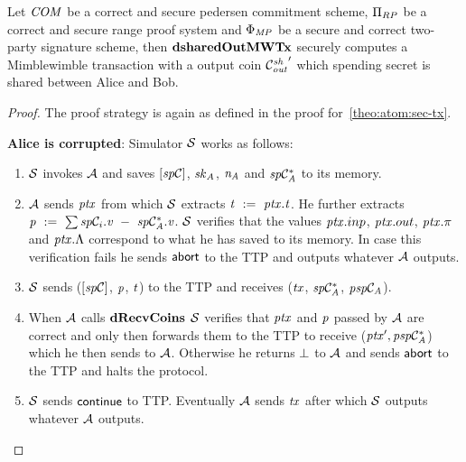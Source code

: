 \begin{theorem}\label{teo:atom:sec-sharedout-tx}
    Let $\mathit{COM}$ be a correct and secure pedersen commitment scheme, $\Pi_{RP}$ be a correct and secure range proof system and $\Phi_{\mathit{MP}}$ be a secure and correct two-party signature scheme, then $\mathbf{dsharedOutMWTx}$ securely computes a Mimblewimble transaction with a output coin ${\mathcal{C}_{\mathit{out}}^{\mathit{sh}}}'$ which spending secret is shared between Alice and Bob.
\end{theorem}

\begin{proof}
    The proof strategy is again as defined in the proof for~\cref{theo:atom:sec-tx}.

    \textbf{Alice is corrupted}: Simulator $\mathcal{S}$ works as follows:
    \begin{enumerate}
        \item $\mathcal{S}$ invokes $\mathcal{A}$ and saves $[\mathit{sp}\mathcal{C}]$, $\mathit{sk}_{\mathit{A}}$, $\mathit{\mathit{n}_{\mathit{A}}}$ and $\mathit{sp}\mathcal{C}_{\mathit{A}}^*$ to its memory.
        \item $\mathcal{A}$ sends $\mathit{ptx}$ from which $\mathcal{S}$ extracts $\mathit{t} ~:=~ \mathit{ptx}.\mathit{t}$.
        He further extracts $\mathit{p} ~:=~ \sum\mathit{sp}\mathcal{C}_i.\mathit{v} ~-~ \mathit{sp}\mathcal{C}_{\mathit{A}}^*.\mathit{v}$.
        $\mathcal{S}$ verifies that the values $\mathit{ptx}.inp$, $\mathit{ptx}.out$, $\mathit{ptx}.\pi$ and $\mathit{ptx}.\Lambda$ correspond to what he has saved to its memory.
        In case this verification fails he sends $\mathsf{abort}$ to the TTP and outputs whatever $\mathcal{A}$ outputs.
        \item $\mathcal{S}$ sends ($[\mathit{sp}\mathcal{C}]$, $\mathit{p}$, $\mathit{t}$) to the TTP and receives ($\mathit{tx}$, $\mathit{sp}\mathcal{C}_{\mathit{A}}^*$, $\mathit{psp}\mathcal{C}_{\mathit{A}}$).
        \item When $\mathcal{A}$ calls $\mathbf{dRecvCoins}$ $\mathcal{S}$ verifies that $\mathit{ptx}$ and $\mathit{p}$ passed by $\mathcal{A}$ are correct and only then forwards them to the TTP to receive (${\mathit{ptx}}', \mathit{psp}\mathcal{C}_{\mathit{A}}^*$) which he then sends to $\mathcal{A}$.
        Otherwise he returns $\bot$ to $\mathcal{A}$ and sends $\mathsf{abort}$ to the TTP and halts the protocol.
        \item $\mathcal{S}$ sends $\mathsf{continue}$ to TTP.
        Eventually $\mathcal{A}$ sends $\mathit{tx}$ after which $\mathcal{S}$ outputs whatever $\mathcal{A}$ outputs.
    \end{enumerate}


\end{proof}
